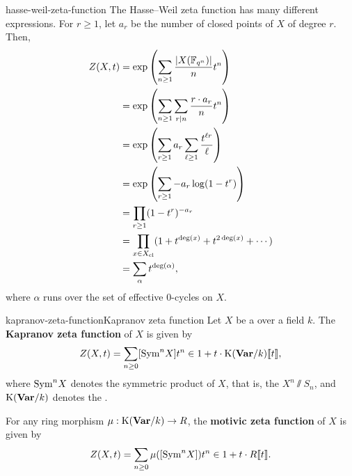 \begin{example}{hasse-weil-zeta-function}
    The Hasse--Weil zeta function has many different expressions. For $r \ge 1$, let $a_r$ be the number of closed points of $X$ of degree $r$. Then,
    \[ \begin{aligned}
        Z(X, t)
            &= \exp \left( \sum_{n \ge 1} \frac{|X(\mathbb{F}_{q^n})|}{n} t^n \right) \\
            &= \exp \left( \sum_{n \ge 1} \sum_{r | n} \frac{r \cdot a_r}{n} t^n \right) \\
            &= \exp \left( \sum_{r \ge 1} a_r \sum_{\ell \ge 1} \frac{t^{\ell r}}{\ell} \right) \\
            &= \exp \left( \sum_{r \ge 1} - a_r \log (1 - t^r) \right) \\
            &= \prod_{r \ge 1} (1 - t^r)^{-a_r} \\
            &= \prod_{x \in X_{\textup{cl}}} (1 + t^{\deg(x)} + t^{2 \deg(x)} + \cdots) \\
            &= \sum_{\alpha} t^{\deg(\alpha)} ,
    \end{aligned}\]
    where $\alpha$ runs over the set of effective $0$-cycles on $X$.
\end{example}

\begin{topic}{kapranov-zeta-function}{Kapranov zeta function}
    Let $X$ be a  over a field $k$. The \textbf{Kapranov zeta function} of $X$ is given by
    \[ Z(X, t) = \sum_{n \ge 0} [\textup{Sym}^n X] t^n \in 1 + t \cdot \textup{K}(\textbf{Var}/k) \llbracket t \rrbracket , \]
    where $\textup{Sym}^n X$ denotes the symmetric product of $X$, that is, the  $X^n \sslash S_n$, and $\textup{K}(\textbf{Var}/k)$ denotes the .
    
    For any ring morphism $\mu : \textup{K}(\textbf{Var}/k) \to R$, the \textbf{motivic zeta function} of $X$ is given by
    \[ Z(X, t) = \sum_{n \ge 0} \mu([\textup{Sym}^n X]) t^n \in 1 + t \cdot R \llbracket t \rrbracket . \]
\end{topic}

